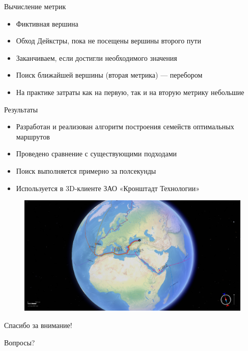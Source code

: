 \documentclass[russian, hyperref={unicode}]{beamer}
\theoremstyle{definition}
\begin{document}
\begin{frame}{Вычисление метрик}
    \begin{itemize}
        \item Фиктивная вершина
        \item Обход Дейкстры, пока не посещены вершины второго пути 
        \item Заканчиваем, если достигли необходимого значения
        \item Поиск ближайшей вершины (вторая метрика) — перебором
        \item На практике затраты как на первую, так и на вторую
          метрику небольшие
    \end{itemize}
\end{frame}

\begin{frame}{Результаты}
     {
        \begin{itemize}
            \item Разработан и реализован алгоритм построения семейств оптимальных маршрутов 
            \item Проведено сравнение с существующими подходами 
            \item Поиск выполняется примерно за полсекунды 
            \item Используется в 3D-клиенте ЗАО «Кронштадт Технологии»
        \end{itemize}
    }
     {
        \begin{figure}
            \includegraphics[width=\textwidth]{results}
        \end{figure}
    }
\end{frame}

\begin{frame}{Спасибо за внимание!}
    \begin{center}
        \Huge
        {\color{blue} Вопросы?}
    \end{center}
\end{frame}
\end{document}
